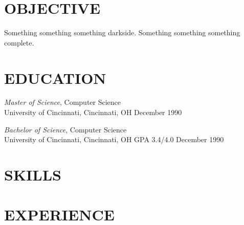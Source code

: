 \documentclass[11pt, line]{res}
\begin{document}
	\address{8228 Melrose Ln\\ Maineville, OH 45039\\ (513) 259-0656\\ ross@rhadden.com}

	\begin{resume}
		\section{OBJECTIVE}
			Something something something darkside.  Something something something complete.

		\section{EDUCATION}
			\textit{Master of Science}, Computer Science \\
			University of Cincinnati, Cincinnati, OH \hspace{0.2in} \hfill December 1990

			\textit{Bachelor of Science}, Computer Science \\
			University of Cincinnati, Cincinnati, OH \hspace{0.2in}  GPA 3.4/4.0 \hfill December 1990

		\section{SKILLS}

		\section{EXPERIENCE}
	\end{resume}
\end{document}
